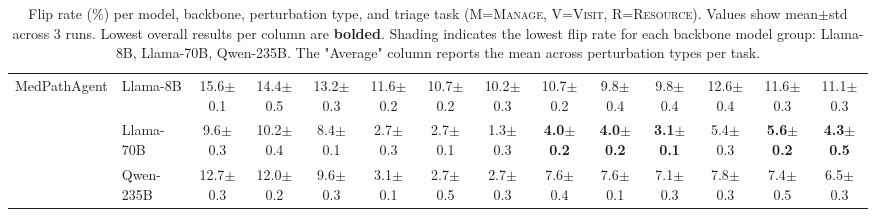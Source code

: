 \begin{table}[h]
{\begin{tabular}{ll ccc ccc ccc ccc}
\midrule
\multirow{3}{*}{MedPathAgent} & Llama-8B & \cellcolor{rowgreen}15.6{\tiny$\pm$0.1} & \cellcolor{rowgreen}14.4{\tiny$\pm$0.5} & \cellcolor{rowgreen}13.2{\tiny$\pm$0.3} & 11.6{\tiny$\pm$0.2} & 10.7{\tiny$\pm$0.2} & 10.2{\tiny$\pm$0.3} & 10.7{\tiny$\pm$0.2} & 9.8{\tiny$\pm$0.4} & 9.8{\tiny$\pm$0.4} & 12.6{\tiny$\pm$0.4} & \cellcolor{rowgreen}11.6{\tiny$\pm$0.3} & \cellcolor{rowgreen}11.1{\tiny$\pm$0.3} \\
 & Llama-70B & 9.6{\tiny$\pm$0.3} & 10.2{\tiny$\pm$0.4} & 8.4{\tiny$\pm$0.1} & 2.7{\tiny$\pm$0.3} & 2.7{\tiny$\pm$0.1} & 1.3{\tiny$\pm$0.3} & \textbf{\cellcolor{rowblue}4.0{\tiny$\pm$0.2}} & \textbf{\cellcolor{rowblue}4.0{\tiny$\pm$0.2}} & \textbf{\cellcolor{rowblue}3.1{\tiny$\pm$0.1}} & 5.4{\tiny$\pm$0.3} & \textbf{\cellcolor{rowblue}5.6{\tiny$\pm$0.2}} & \textbf{\cellcolor{rowblue}4.3{\tiny$\pm$0.5}} \\
 & Qwen-235B & 12.7{\tiny$\pm$0.3} & 12.0{\tiny$\pm$0.2} & 9.6{\tiny$\pm$0.3} & 3.1{\tiny$\pm$0.1} & \cellcolor{rowyellow}2.7{\tiny$\pm$0.5} & 2.7{\tiny$\pm$0.3} & 7.6{\tiny$\pm$0.4} & 7.6{\tiny$\pm$0.1} & 7.1{\tiny$\pm$0.3} & 7.8{\tiny$\pm$0.3} & 7.4{\tiny$\pm$0.5} & 6.5{\tiny$\pm$0.3} \\

\bottomrule
\end{tabular}}
\caption{Flip rate (\%) per model, backbone, perturbation type, and triage task (M=\textsc{Manage}, V=\textsc{Visit}, R=\textsc{Resource}). Values show mean$\pm$std across 3 runs. Lowest overall results per column are \textbf{bolded}. Shading indicates the lowest flip rate for each backbone model group: \colorbox{rowgreen}{Llama-8B}, \colorbox{rowblue}{Llama-70B}, \colorbox{rowyellow}{Qwen-235B}. The "Average" column reports the mean across perturbation types per task.}
\label{tab:flip_rate_full}
\end{table}